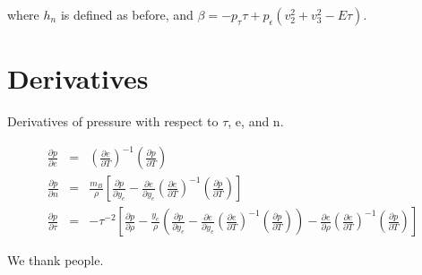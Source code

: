 \documentclass[twocolumn]{aastex62}
\begin{document}
where $h_{n}$ is defined as before, and $\beta = -p_{\tau}\tau + p_{\epsilon}(v_{2}^{2} + v_{3}^{2} -E\tau)$.

\section{Derivatives}

Derivatives of pressure with respect to $\tau$, e, and n. \\
\begin{footnotesize}
\begin{eqnarray}
	\frac{\partial{p}}{\partial{e}} &=& \left(\frac{\partial{e}}{\partial{T}}\right)^{-1}\left(\frac{\partial{p}}{\partial{T}}\right) \\
	\frac{\partial{p}}{\partial{n}} &=& \frac{m_B}{\rho} \left[ \frac{\partial{p}}{\partial{y_e}} -
          \frac{\partial{e}}{\partial{y_e}}\left(\frac{\partial{e}}{\partial{T}}\right)^{-1}\left(\frac{\partial{p}}{\partial{T}}\right)\right]\\
	\frac{\partial{p}}{\partial{\tau}} &=& -\tau^{-2} \left[ \frac{\partial{p}}{\partial{\rho}} - \frac{y_e}{\rho} \left( \frac{\partial{p}}{\partial{y_e}} -
          \frac{\partial{e}}{\partial{y_e}} \left(\frac{\partial{e}}{\partial{T}}\right)^{-1}\left(\frac{\partial{p}}{\partial{T}}\right)\right) -
          \frac{\partial{e}}{\partial{\rho}}\left(\frac{\partial{e}}{\partial{T}}\right)^{-1}\left(\frac{\partial{p}}{\partial{T}}\right)\right]
\end{eqnarray}
\end{footnotesize}

\acknowledgements
We thank people.


\end{document}
